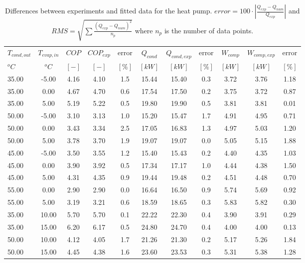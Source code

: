 \documentclass[english]{SPFShortReport}
\begin{document}
\begin{table}[!ht]
\begin{small}
\caption{Differences between experiments and fitted data for the heat pump.          $error=100 \cdot |\frac{Q_{exp}-Q_{num}}{Q_{exp}}|$ and $RMS = \sqrt { \sum{\frac{(Q_{exp}-Q_{num})^2}{n_p}} }$ where $n_p$ is the number of data points.}
\begin{center}
\resizebox{12cm}{!} 
{
\begin{tabular}{l | c c c c c c c c c c } 
\hline
\hline
$T_{cond,out}$ &$T_{evap,in}$ &$COP$ &$COP_{exp}$ &error &$Q_{cond}$ &$Q_{cond,exp}$ &error &$W_{comp}$ &$W_{comp,exp}$ &error \\ 
$^oC$ &$^oC$ &$[-]$ &$[-]$ &$[\%]$ &$[kW]$ &$[kW]$ &$[\%]$ &$[kW]$ &$[kW]$ &$[\%]$\\ 
\hline
35.00  & -5.00 & 4.16 & 4.10 & 1.5 & 15.44 & 15.40 & 0.3 & 3.72 & 3.76 & 1.18\\ 
35.00  & 0.00 & 4.67 & 4.70 & 0.6 & 17.54 & 17.50 & 0.2 & 3.75 & 3.72 & 0.87\\ 
35.00  & 5.00 & 5.19 & 5.22 & 0.5 & 19.80 & 19.90 & 0.5 & 3.81 & 3.81 & 0.01\\ 
50.00  & -5.00 & 3.10 & 3.13 & 1.0 & 15.20 & 15.47 & 1.7 & 4.91 & 4.95 & 0.71\\ 
50.00  & 0.00 & 3.43 & 3.34 & 2.5 & 17.05 & 16.83 & 1.3 & 4.97 & 5.03 & 1.20\\ 
50.00  & 5.00 & 3.78 & 3.70 & 1.9 & 19.07 & 19.07 & 0.0 & 5.05 & 5.15 & 1.88\\ 
45.00  & -5.00 & 3.50 & 3.55 & 1.2 & 15.40 & 15.43 & 0.2 & 4.40 & 4.35 & 1.03\\ 
45.00  & 0.00 & 3.90 & 3.92 & 0.5 & 17.34 & 17.17 & 1.0 & 4.44 & 4.38 & 1.50\\ 
45.00  & 5.00 & 4.31 & 4.35 & 0.9 & 19.44 & 19.48 & 0.2 & 4.51 & 4.48 & 0.70\\ 
55.00  & 0.00 & 2.90 & 2.90 & 0.0 & 16.64 & 16.50 & 0.9 & 5.74 & 5.69 & 0.92\\ 
55.00  & 5.00 & 3.19 & 3.21 & 0.6 & 18.59 & 18.65 & 0.3 & 5.83 & 5.82 & 0.30\\ 
35.00  & 10.00 & 5.70 & 5.70 & 0.1 & 22.22 & 22.30 & 0.4 & 3.90 & 3.91 & 0.29\\ 
35.00  & 15.00 & 6.20 & 6.17 & 0.5 & 24.80 & 24.70 & 0.4 & 4.00 & 4.00 & 0.13\\ 
50.00  & 10.00 & 4.12 & 4.05 & 1.7 & 21.26 & 21.30 & 0.2 & 5.17 & 5.26 & 1.84\\ 
50.00  & 15.00 & 4.45 & 4.38 & 1.6 & 23.60 & 23.53 & 0.3 & 5.31 & 5.38 & 1.28\\ 

\end{tabular}}
\end{center}
\end{small}
\end{table}
\end{document}
